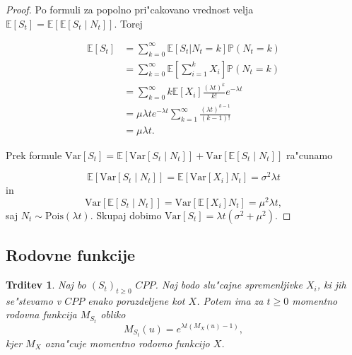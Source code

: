 \documentclass[12pt, a4paper, reqno]{amsart}
\theoremstyle{definition} %
\theoremstyle{plain} %
\newtheorem{trditev}[definicija]{Trditev}
\newcommand{\E}{\mathbb{E}}
\newcommand{\Prob}{\mathbb{P}}
\newcommand{\1}{\mathds{1}}
\newcommand{\Pois}[1]{\text{Pois}(#1)}
\newcommand{\Var}[1]{\text{Var}\left[#1\right]}
\begin{document}
        \begin{proof}
        Po formuli za popolno pri"cakovano vrednost velja 
        $\E\left[S_t\right] = \E\left[\E\left[S_t\mid N_t\right]\right]$. Torej

        \begin{align*}
            \E\left[S_t\right] &= \sum_{k=0}^{\infty} \E\left[S_t | N_t = k\right] \Prob\left(N_t = k\right)\\
                               &= \sum_{k=0}^{\infty} \E\left[\sum_{i=1}^{k} X_i\right] \Prob\left(N_t = k\right)\\
                               &= \sum_{k=0}^{\infty}k\E\left[X_i\right]\frac{(\lambda t)^k}{k!}e^{-\lambda t}\\
                               &= \mu\lambda te^{-\lambda t}\sum_{k=1}^{\infty}\frac{(\lambda t)^{k-1}}{(k-1)!}\\
                               &= \mu\lambda t.
        \end{align*}

        \noindent
        Prek formule $\Var{S_t} = \E\left[\Var{S_t\mid N_t}\right] + \Var{\E\left[S_t\mid N_t\right]}$ ra"cunamo 

        \begin{equation*}
            \E\left[\Var{S_t\mid N_t}\right] = \E\left[\Var{X_i}N_t\right] = \sigma^2\lambda t
        \end{equation*}
        in 
        \begin{equation*}
            \Var{\E\left[S_t\mid N_t\right]} = \Var{\E\left[X_i\right]N_t} = \mu^2\lambda t,
        \end{equation*}
        saj $N_t\sim\Pois{\lambda t}$. Skupaj dobimo $\Var{S_t} = \lambda t\left(\sigma^2 + \mu^2\right)$.
    \end{proof}

    \subsection{Rodovne funkcije}

    \begin{trditev}
        Naj bo $(S_t)_{t\geq0}$ $CPP$. Naj bodo slu"cajne spremenljivke $X_i$, ki jih se"stevamo v 
        $CPP$ enako porazdeljene kot $X$. Potem ima za $t\geq0$ momentno rodovna funkcija $M_{S_t}$ 
        obliko
        \begin{equation*}
            M_{S_t}(u) = e^{\lambda t\left(M_X(u) - 1\right)}, 
        \end{equation*}
        kjer $M_X$ ozna"cuje momentno rodovno funkcijo $X$.
        \label{trd:MomentGener}
    \end{trditev}
    
\end{document}
